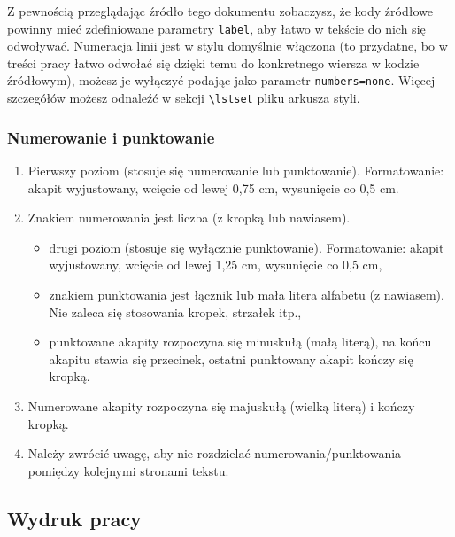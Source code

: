 \documentclass[12pt,twoside]{article}
\begin{document}
Z pewnością przeglądając źródło tego dokumentu zobaczysz, że kody źródłowe powinny mieć zdefiniowane parametry \verb|label|, aby łatwo w tekście do nich się odwoływać.
Numeracja linii jest w stylu domyślnie włączona (to przydatne, bo w treści pracy łatwo odwołać się dzięki temu do konkretnego wiersza w kodzie źródłowym), możesz je wyłączyć podając jako parametr \verb|numbers=none|. Więcej szczegółów możesz odnaleźć w sekcji \verb|\lstset| pliku arkusza styli. 


\subsubsection{Numerowanie i punktowanie}

\begin{enumerate}[label=\arabic*), leftmargin=1.25cm]
	\item Pierwszy poziom (stosuje się numerowanie lub punktowanie). Formatowanie:
	akapit wyjustowany, wcięcie od lewej 0,75 cm, wysunięcie co 0,5 cm.
	\item Znakiem numerowania jest liczba (z kropką lub nawiasem).
		\begin{itemize}[label=-,labelsep=0.4cm,leftmargin=0.6cm]
			\item drugi poziom (stosuje się wyłącznie punktowanie). Formatowanie: akapit
			wyjustowany, wcięcie od lewej 1,25 cm, wysunięcie co 0,5 cm,
			\item znakiem punktowania jest łącznik lub mała litera alfabetu (z nawiasem). Nie
			zaleca się stosowania kropek, strzałek itp.,
			\item punktowane akapity rozpoczyna się minuskułą (małą literą), na końcu akapitu
			stawia się przecinek, ostatni punktowany akapit kończy się kropką.
		\end{itemize}
	\item Numerowane akapity rozpoczyna się majuskułą (wielką literą) i kończy kropką.
	\item Należy zwrócić uwagę, aby nie rozdzielać numerowania/punktowania pomiędzy
	kolejnymi stronami tekstu.
\end{enumerate}


{\subsection{Wydruk pracy}}
\end{document}

